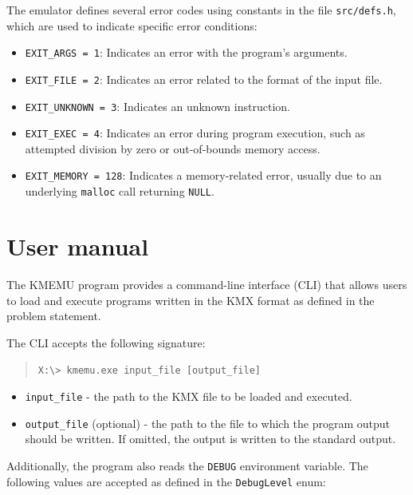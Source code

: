 \documentclass[12pt,a4paper]{paper}
\newcommand{\code}[1]{\texttt{#1}}
\begin{document}
The emulator defines several error codes using constants in the file
\code{src/defs.h}, which are used to indicate specific error conditions:

\begin{itemize}
    \item \code{EXIT_ARGS = 1}: Indicates an error with the program's arguments.
    \item \code{EXIT_FILE = 2}: Indicates an error related to the format of the
        input file.
    \item \code{EXIT_UNKNOWN = 3}: Indicates an unknown instruction.
    \item \code{EXIT_EXEC = 4}: Indicates an error during program execution,
        such as attempted division by zero or out-of-bounds memory access.
    \item \code{EXIT_MEMORY = 128}: Indicates a memory-related error, usually
        due to an underlying \code{malloc} call returning \code{NULL}.
\end{itemize}

\section{User manual}

The KMEMU program provides a command-line interface (CLI) that allows users to
load and execute programs written in the KMX format as defined in the problem
statement. 

The CLI accepts the following signature:

\begin{quotation}
\code{X:\textbackslash> kmemu.exe \textlangle input_file\textrangle\ 
[\textlangle output_file\textrangle]}
\end{quotation}


\begin{itemize}
    \item \code{\textlangle input_file\textrangle} - the path to the KMX file to
        be loaded and executed.
    \item \code{\textlangle output_file\textrangle} (optional) - the path to the
        file to which the program output should be written. If omitted, the
        output is written to the standard output.
\end{itemize}

Additionally, the program also reads the \code{DEBUG} environment variable. The
following values are accepted as defined in the \code{DebugLevel} enum:
\end{document}
